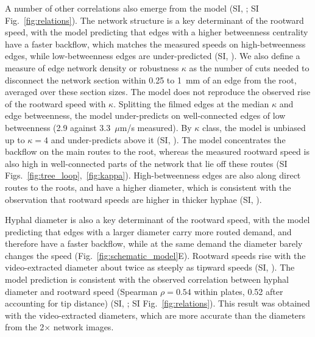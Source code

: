A number of other correlations also emerge from the model (SI, ; SI Fig.~\ref{fig:relations}). 
The network structure is a key determinant of the rootward speed, with the model predicting that edges with a higher betweenness centrality have a faster backflow, which matches the measured speeds on high-betweenness edges, while low-betweenness edges are under-predicted (SI, ).
We also define a measure of edge network density or robustness $\kappa$ as the number of cuts needed to disconnect the network section within 0.25 to 1~mm of an edge from the root, averaged over these section sizes.
The model does not reproduce the observed rise of the rootward speed with $\kappa$.
Splitting the filmed edges at the median $\kappa$ and edge betweenness, the model under-predicts on well-connected edges of low betweenness (2.9 against 3.3~$\mu$m/s measured).
By $\kappa$ class, the model is unbiased up to $\kappa = 4$ and under-predicts above it (SI, ).
The model concentrates the backflow on the main routes to the root, whereas the measured rootward speed is also high in well-connected parts of the network that lie off these routes (SI Figs.~\ref{fig:tree_loop},~\ref{fig:kappa}).
High-betweenness edges are also along direct routes to the roots, and have a higher diameter, which is consistent with the observation that rootward speeds are higher in thicker hyphae (SI, ).

Hyphal diameter is also a key determinant of the rootward speed, with the model predicting that edges with a larger diameter carry more routed demand, and therefore have a faster backflow, while at the same demand the diameter barely changes the speed (Fig.~\ref{fig:schematic_model}E).
Rootward speeds rise with the video-extracted diameter about twice as steeply as tipward speeds (SI, ).
The model prediction is consistent with the observed correlation between hyphal diameter and rootward speed (Spearman $\rho = 0.54$ within plates, 0.52 after accounting for tip distance) (SI, ; SI Fig.~\ref{fig:relations}).
This result was obtained with the video-extracted diameters, which are more accurate than the diameters from the 2$\times$ network images.


